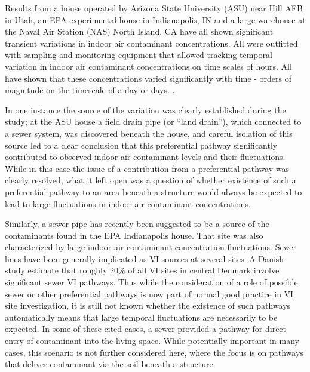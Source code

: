 \documentclass[journal=esthag,manuscript=article]{achemso}
\begin{document}
Results from a house operated by Arizona State University (ASU) near Hill AFB in Utah, an EPA experimental house in Indianapolis, IN and a large warehouse at the Naval Air Station (NAS) North Island, CA have all shown significant transient variations in indoor air contaminant concentrations.
All were outfitted with sampling and monitoring equipment that allowed tracking temporal variation in indoor air contaminant concentrations on time scales of hours.
All have shown that these concentrations varied significantly with time - orders of magnitude on the timescale of a day or days.
\cite{holton_evaluation_2015,guo_vapor_2015,hosangadi_high-frequency_2017}. \par

In one instance the source of the variation was clearly established during the study; at the ASU house a field drain pipe (or “land drain”), which connected to a sewer system, was discovered beneath the house, and careful isolation of this source led to a clear conclusion that this preferential pathway significantly contributed to observed indoor air contaminant levels and their fluctuations\cite{guo_vapor_2015,guo_identification_2015}.
While in this case the issue of a contribution from a preferential pathway was clearly resolved, what it left open was a question of whether existence of such a preferential pathway to an area beneath a structure would always be expected to lead to large fluctuations in indoor air contaminant concentrations. \par

Similarly, a sewer pipe has recently been suggested to be a source of the contaminants found in the EPA Indianapolis house.
That site was also characterized by large indoor air contaminant concentration fluctuations\cite{mchugh_evidence_2017,u.s._environmental_protection_agency_assessment_2015}.
Sewer lines have been generally implicated as VI sources at several sites\cite{pennell_sewer_2013,mchugh_evidence_2017,roghani_occurrence_2018,riis_vapor_2010}.
A Danish study estimate that roughly 20\% of all VI sites in central Denmark involve significant sewer VI pathways\cite{nielsen_remediation_2017}.
Thus while the consideration of a role of possible sewer or other preferential pathways is now part of normal good practice in VI site investigation\cite{u.s._environmental_protection_agency_oswer_2015}, it is still not known whether the existence of such pathways automatically means that large temporal fluctuations are necessarily to be expected.
In some of these cited cases\cite{pennell_sewer_2013,riis_vapor_2010}, a sewer provided a pathway for direct entry of contaminant into the living space.
While potentially important in many cases, this scenario is not further considered here, where the focus is on pathways that deliver contaminant via the soil beneath a structure. \par
\end{document}
